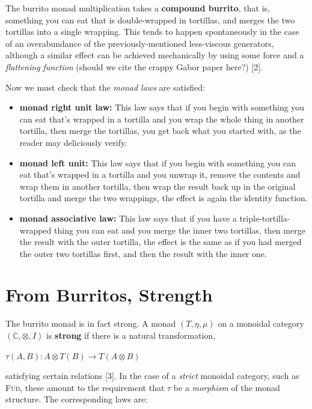 \documentclass[10pt,twoside,openleft]{memoir}
\begin{document}
The burrito monad multiplication takes a \textbf{compound burrito}, that is, something you can eat that is double-wrapped in tortillas, and merges the two tortillas into a single wrapping. This tends to happen spontaneously in the case of
an overabundance of the previously-mentioned less-viscous generators, although
a similar effect can be achieved mechanically by using some force and a \textit{flattening
function} (should we cite the crappy Gabor paper here?) [2].

Now we must check that the \textit{monad laws} are satisfied:

\begin{itemize}
 \item[] \textbf{monad right unit law:} This law says that if you begin with something you can
eat that's wrapped in a tortilla and you wrap the whole thing in another
tortilla, then merge the tortillas, you get back what you started with, as
the reader may deliciously verify.
 \item[] \textbf{monad left unit:} This law says that if you begin with something you can
eat that’s wrapped in a tortilla and you unwrap it, remove the contents and wrap them in another tortilla, then wrap the result back up in the
original tortilla and merge the two wrappings, the effect is again the identity function.
 \item[] \textbf{monad associative law:} This law says that if you have a triple-tortilla-wrapped
thing you can eat and you merge the inner two tortillas, then merge the
result with the outer tortilla, the effect is the same as if you had merged
the outer two tortillas first, and then the result with the inner one.
\end{itemize}

\section{From Burritos, Strength}

The burrito monad is in fact strong. A monad $(T, \eta, \mu)$ on a monoidal category
$(\mathbb{C}, \otimes, I)$ is \textbf{strong} if there is a natural transformation,

\begin{center}
 $\tau(A, B) : A \otimes T(B) \rightarrow T(A \otimes B)$
\end{center}

satisfying certain relations [3]. In the case of a \textit{strict} monoidal category, such
as \textsc{F\"ud}, these amount to the requirement that $\tau$ be a \textit{morphism} of the monad
structure. The corresponding laws are:
\end{document}
